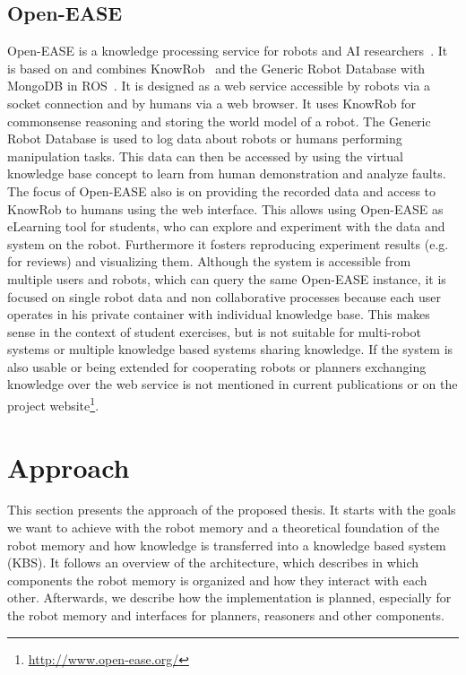 \documentclass[a4paper,11pt]{article}
\begin{document}
\subsection{Open-EASE}
\label{sec:openease}
Open-EASE is a knowledge processing service for robots and AI
researchers~\cite{OpenEASE}. It is based on and combines
KnowRob~\cite{KnowRob} and the Generic Robot Database with MongoDB in
ROS~\cite{RoboDB}. It is designed as a web service accessible by
robots via a socket connection and by humans via a web browser. It
uses KnowRob for commonsense reasoning and storing the world model of
a robot. The Generic Robot Database is used to log data about robots
or humans performing manipulation tasks. This data can then be
accessed by using the virtual knowledge base concept to learn from
human demonstration and analyze faults. The focus of Open-EASE also is
on providing the recorded data and access to KnowRob to humans using
the web interface. This allows using Open-EASE as eLearning tool for
students, who can explore and experiment with the data and system on
the robot. Furthermore it fosters reproducing experiment results
(e.g. for reviews) and visualizing them. Although the system is
accessible from multiple users and robots, which can query the same
Open-EASE instance, it is focused on single robot data and non
collaborative processes because each user operates in his private
container with individual knowledge base. This makes sense in the
context of student exercises, but is not suitable for multi-robot
systems or multiple knowledge based systems sharing knowledge. If the
system is also usable or being extended for cooperating robots or
planners exchanging knowledge over the web service is not mentioned in
current publications or on the project
website\footnote{\url{http://www.open-ease.org/}}.


\section{Approach}
\label{sec:approach}
This section presents the approach of the proposed thesis. It starts
with the goals we want to achieve with the robot memory and a
theoretical foundation of the robot memory and how knowledge is
transferred into a knowledge based system (KBS). It follows an overview of the
architecture, which describes in which components the robot memory is
organized and how they interact with each other. Afterwards, we
describe how the implementation is planned, especially for the robot
memory and interfaces for planners, reasoners and other components.
\end{document}
